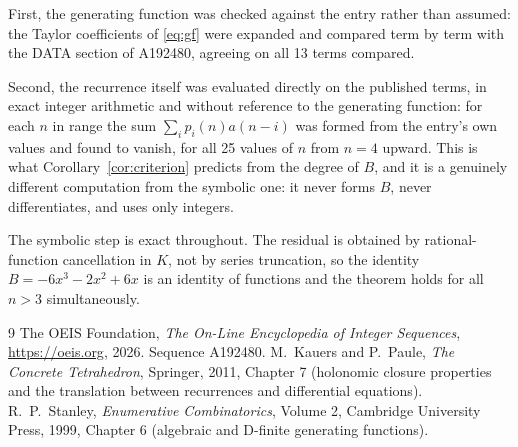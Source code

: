 \documentclass[11pt,a4paper]{article}
\theoremstyle{plain}
\theoremstyle{definition}
\begin{document}
First, the generating function was checked against the entry rather than assumed: the
Taylor coefficients of \eqref{eq:gf} were expanded and compared term by term with the DATA
section of A192480, agreeing on all 13 terms compared.

Second, the recurrence itself was evaluated directly on the published terms, in exact
integer arithmetic and without reference to the generating function: for each $n$ in range
the sum $\sum_{i}p_{i}(n)a(n-i)$ was formed from the entry's own values and found to
vanish, for all 25 values of $n$ from $n=4$ upward. This is what
Corollary~\ref{cor:criterion} predicts from the degree of $B$, and it is a genuinely
different computation from the symbolic one: it never forms $B$, never differentiates, and
uses only integers.

The symbolic step is exact throughout. The residual is obtained by rational-function
cancellation in $K$, not by series truncation, so the identity $B=- 6 x^{3} - 2 x^{2} + 6 x$ is an
identity of functions and the theorem holds for all $n>3$ simultaneously.

\begin{thebibliography}{9}
 The OEIS Foundation, \emph{The On-Line Encyclopedia of Integer Sequences},
\url{https://oeis.org}, 2026. Sequence A192480.
 M.~Kauers and P.~Paule, \emph{The Concrete Tetrahedron}, Springer, 2011,
Chapter 7 (holonomic closure properties and the translation between recurrences and
differential equations).
 R.~P.~Stanley, \emph{Enumerative Combinatorics}, Volume 2, Cambridge
University Press, 1999, Chapter 6 (algebraic and D-finite generating functions).
\end{thebibliography}
\end{document}
